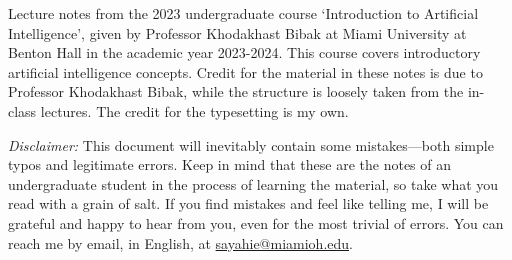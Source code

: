 Lecture notes from the 2023 undergraduate course `Introduction to Artificial Intelligence', given by Professor Khodakhast Bibak at Miami University at Benton Hall in the academic year 2023-2024. This course covers introductory artificial intelligence concepts. Credit for the material in these notes is due to Professor Khodakhast Bibak, while the structure is loosely taken from the in-class lectures. The credit for the typesetting is my own.

\textit{Disclaimer:} This document will inevitably contain some mistakes---both simple typos and legitimate errors. Keep in mind that these are the notes of an undergraduate student in the process of learning the material, so take what you read with a grain of salt. If you find mistakes and feel like telling me, I will be grateful and happy to hear from you, even for the most trivial of errors. You can reach me by email, in English, at \href{mailto:sayahie@miamioh.edu}{sayahie@miamioh.edu}.

\doclicenseThis